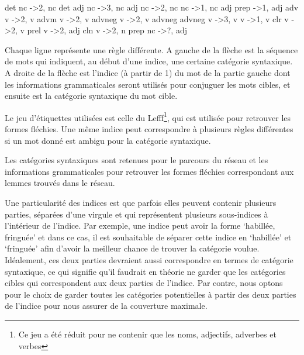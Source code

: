 \begin{framed}
det nc -\textgreater 2, nc\newline
det adj nc -\textgreater 3, nc\newline
adj nc -\textgreater 2, nc\newline
nc -\textgreater 1, nc\newline
adj prep -\textgreater 1, adj\newline
adv v -\textgreater 2, v\newline
advm v -\textgreater 2, v\newline
advneg v -\textgreater 2, v\newline
advneg advneg v -\textgreater 3, v\newline
v -\textgreater 1, v\newline
clr v -\textgreater 2, v\newline
prel v -\textgreater 2, adj \newline
cln v -\textgreater 2, n\newline
prep nc -\textgreater ?, adj
\end{framed}

Chaque ligne représente une règle différente. A gauche de la flèche est la 
séquence de mots qui indiquent, au début d'une indice, une certaine catégorie 
syntaxique. A droite de la flèche est l'indice (à partir de 1) du mot de la 
partie gauche dont les informations grammaticales seront utilisés pour conjuguer 
les mots cibles, et ensuite est la catégorie syntaxique du mot cible. 

Le jeu d'étiquettes utilisées est celle du Lefff\footnote{Ce jeu a été réduit 
pour ne contenir que les noms, adjectifs, adverbes et verbes}, qui est utilisée 
pour retrouver les formes fléchies. Une même indice peut correspondre à 
plusieurs règles différentes si un mot donné est ambigu pour la catégorie 
syntaxique.

Les catégories syntaxiques sont retenues pour le parcours du réseau et les 
informations grammaticales pour retrouver les formes fléchies correspondant aux 
lemmes trouvés dans le réseau.

Une particularité des indices est que parfois elles peuvent contenir plusieurs 
parties, séparées d'une virgule et qui représentent plusieurs sous-indices à 
l'intérieur de l'indice. Par exemple, une indice peut avoir la forme 
\lq{habillée, fringuée}\rq{} et dans ce cas, il est souhaitable de séparer cette 
indice en \lq{habillée}\rq{} et \lq{fringuée}\rq{} afin d'avoir la meilleur 
chance de trouver la catégorie voulue. Idéalement, ces deux parties devraient 
aussi correspondre en termes de catégorie syntaxique, ce qui signifie qu'il 
faudrait en théorie ne garder que les catégories cibles qui correspondent aux 
deux parties de l'indice. Par contre, nous optons pour le choix de garder toutes 
les catégories potentielles à partir des deux parties de l'indice pour nous 
assurer de la couverture maximale. 

